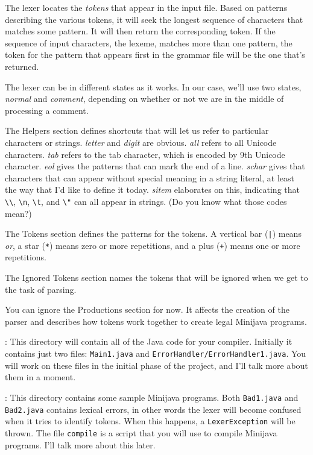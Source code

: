 \documentclass[11pt]{article}
\begin{document}
The lexer locates the {\em tokens} that appear in the input file.  
Based on patterns describing the various tokens, it will seek
the longest sequence of characters that matches some pattern.  It will
then return the corresponding token.  If the sequence of input
characters, the lexeme, matches more than one pattern, the token for
the pattern that appears first in the grammar file will be the one that's returned.

The lexer can be in different states as it works.  In our case, we'll
use two states, {\em normal} and {\em comment}, depending on whether or not we
are in the middle of processing a comment.

The Helpers section defines shortcuts that will let us refer to
particular characters or strings.  {\em letter} and {\em digit} are obvious.
{\em all} refers to all Unicode characters.  {\em tab} refers to the tab
character, which is encoded by 9th Unicode character.  {\em eol} gives the
patterns that can mark the end of a line.  {\em schar} gives that
characters that can appear without special meaning in a string literal, at
least the way that I'd like to define it today.  {\em sitem} elaborates on
this, indicating that \verb'\\', \verb'\n', \verb'\t', and \verb'\"' can all appear in strings.  (Do
you know what those codes mean?)

The Tokens section defines the patterns for the tokens.  A vertical
bar (\verb'|') means {\em or}, a star (\verb'*') means zero or more repetitions, and a
plus (\verb'+') means one or more repetitions.

The Ignored Tokens section names the tokens that will be ignored when
we get to the task of parsing.

You can ignore the Productions section for now.  It affects the creation of the parser and 
describes how tokens work together to create legal Minijava programs.

\mbox{}\par{}:  This directory will contain all of the Java code for your compiler.  Initially it contains just two files: {\tt Main1.java} and {\tt ErrorHandler/ErrorHandler1.java}.  You will work on these files in the initial phase of the project, and I'll talk more about them in a moment.

\mbox{}\par{}:  This directory contains some sample Minijava programs.  Both {\tt Bad1.java} and {\tt Bad2.java} contains lexical errors, in other words the lexer will become confused when it tries to identify tokens.  When this happens, a {\tt LexerException} will be thrown.  The file {\tt compile} is a script that you will use to compile Minijava programs.  I'll talk more about this later.
\end{document}
